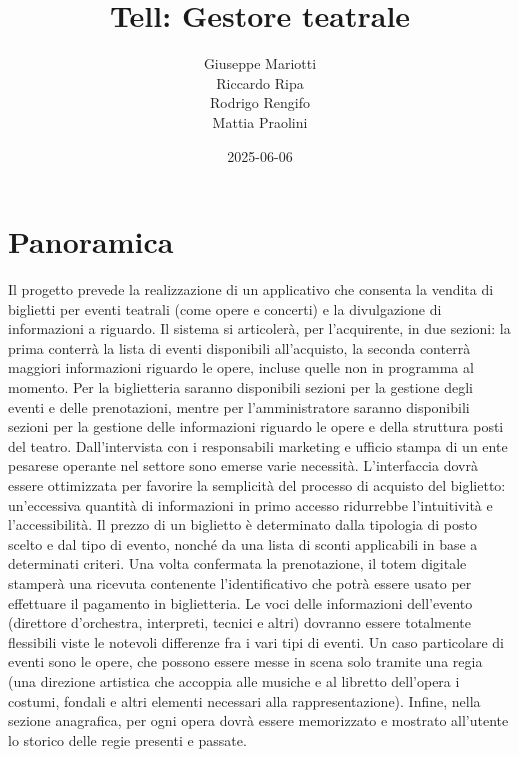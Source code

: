 \documentclass{article}
\title{Tell: Gestore teatrale}
\date{2025-06-06}
\author
{
    Giuseppe Mariotti\\
    Riccardo Ripa\\
    Rodrigo Rengifo\\
    Mattia Praolini
}
\begin{document}
    \maketitle
    \newpage

    \section{Panoramica}
        Il progetto prevede la realizzazione di un applicativo che consenta la vendita di biglietti per eventi teatrali (come opere e concerti) e la divulgazione di informazioni a riguardo. Il sistema si articolerà, per l’acquirente, in due sezioni: la prima conterrà la lista di eventi disponibili all'acquisto, la seconda conterrà maggiori informazioni riguardo le opere, incluse quelle non in programma al momento. Per la biglietteria saranno disponibili sezioni per la gestione degli eventi e delle prenotazioni, mentre per l'amministratore saranno disponibili sezioni per la gestione delle informazioni riguardo le opere e della struttura posti del teatro. Dall’intervista con i responsabili marketing e ufficio stampa di un ente pesarese operante nel settore sono emerse varie necessità. L’interfaccia dovrà essere ottimizzata per favorire la semplicità del processo di acquisto del biglietto: un’eccessiva quantità di informazioni in primo accesso ridurrebbe l’intuitività e l’accessibilità. Il prezzo di un biglietto è determinato dalla tipologia di posto scelto e dal tipo di evento, nonché da una lista di sconti applicabili in base a determinati criteri. Una volta confermata la prenotazione, il totem digitale stamperà una ricevuta contenente l'identificativo che potrà essere usato per effettuare il pagamento in biglietteria. Le voci delle informazioni dell’evento (direttore d’orchestra, interpreti, tecnici e altri) dovranno essere totalmente flessibili viste le notevoli differenze fra i vari tipi di eventi. Un caso particolare di eventi sono le opere, che possono essere messe in scena solo tramite una regia (una direzione artistica che accoppia alle musiche e al libretto dell’opera i costumi, fondali e altri elementi necessari alla rappresentazione). Infine, nella sezione anagrafica, per ogni opera dovrà essere memorizzato e mostrato all’utente lo storico delle regie presenti e passate.
    \newpage
\end{document}
